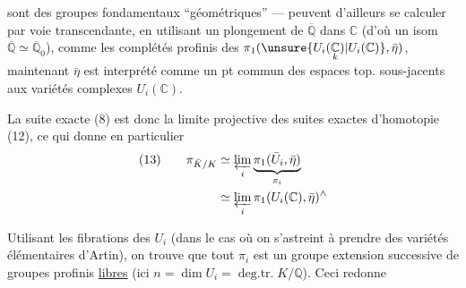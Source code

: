 sont des groupes fondamentaux ``géométriques'' ---  peuvent d'ailleurs se calculer par voie transcendante, en utilisant un plongement de $\overline{\mathbb Q}$ dans $\mathbb C$ (d'où un isom $\overline{\mathbb Q}\simeq\overline{\mathbb Q}_0$), comme les complétés profinis des $\pi_1(\unsure{U_i(\underset{k}{\mathbb C})|U_i(\mathbb C)},\bar\eta)$,  maintenant $\bar\eta$ est interprété comme un pt  commun des espaces top. sous-jacents aux variétés complexes $U_i(\mathbb C)$.

La suite exacte (8) est donc la limite projective des suites exactes d'homotopie (12), ce qui donne en particulier
\[
\begin{aligned}
(13)\qquad \pi_{\bar K/K}&\simeq\varprojlim_i\underbrace{\pi_1(\bar U_i,\bar\eta)}_{\pi_i}\\
&\simeq\varprojlim_i\pi_1(U_i(\mathbb C),\bar\eta)^{\wedge}
\end{aligned}
\]

Utilisant les fibrations des $U_i$ (dans le cas où on s'astreint à prendre des variétés élémentaires d'Artin), on trouve que tout $\pi_i$ est un groupe  extension successive de  groupes profinis \uline{libres} (ici $n=\dim U_i=\operatorname{deg.tr.}K/\mathbb Q$). Ceci redonne
